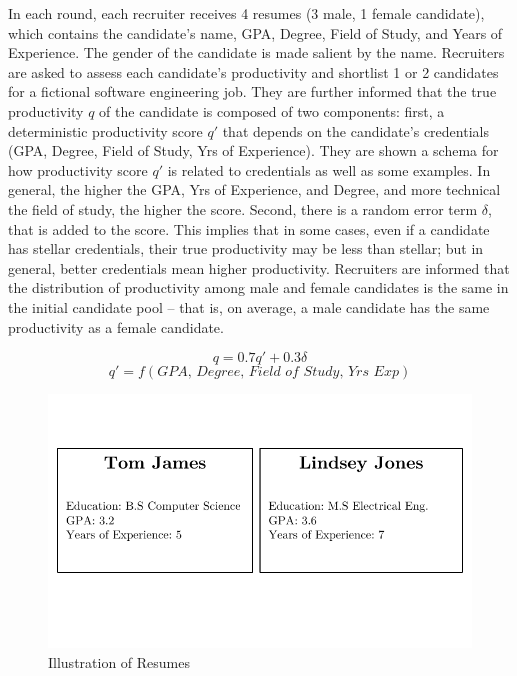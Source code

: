\documentclass[11pt]{article}
\begin{document}
In each round, each recruiter receives 4 resumes (3 male, 1 female candidate)\footnotemark, which contains the candidate's name, GPA, Degree, Field of Study, and Years of Experience. The gender of the candidate is made salient by the name. Recruiters are asked to assess each candidate's productivity and shortlist 1 or 2 candidates for a fictional software engineering job. They are further informed that the true productivity $q$ of the candidate is composed of two components: first, a deterministic productivity score $q'$ that depends on the candidate's credentials (GPA, Degree, Field of Study, Yrs of Experience). They are shown a schema for how productivity score $q'$ is related to credentials as well as some examples. In general, the higher the GPA, Yrs of Experience, and Degree, and more technical the field of study, the higher the score. Second, there is a random error term $\delta$, that is added to the score. This implies that in some cases, even if a candidate has stellar credentials, their true productivity may be less than stellar; but in general, better credentials mean higher productivity. Recruiters are informed that the distribution of productivity among male and female candidates is the same in the initial candidate pool -- that is, on average, a male candidate has the same productivity as a female candidate.


$$q = 0.7q' + 0.3\delta$$
$$q' = f(\textit{GPA, Degree, Field of Study, Yrs Exp})$$



\begin{figure} %
    \centering
    \includegraphics[width=\textwidth, keepaspectratio]{illus/resumes.pdf}
    \caption{Illustration of Resumes}
    \label{sample_resumes}
\end{figure}
\end{document}

